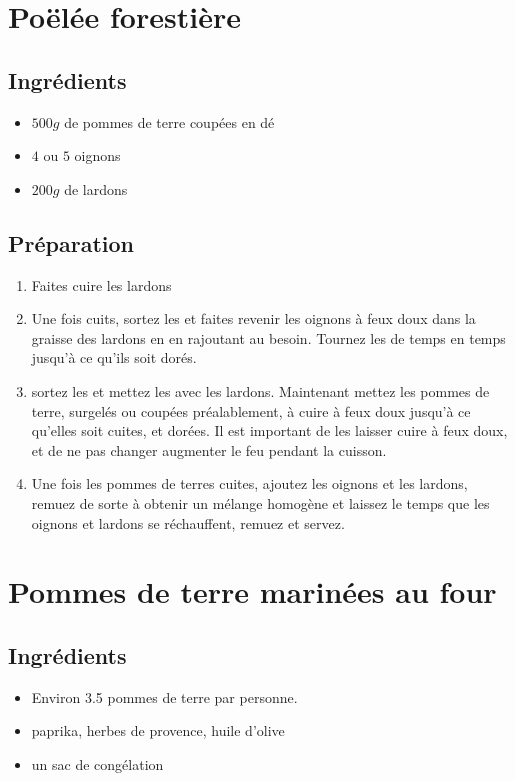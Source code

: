 \newpage
\section{Poëlée forestière}
\subsection*{Ingrédients}
\begin{itemize}
\item $500\unit{g}$ de pommes de terre coupées en dé
\item $4$ ou $5$ oignons
\item $200\unit{g}$ de lardons
\end{itemize}

\subsection*{Préparation}
\begin{enumerate}
\item Faites cuire les lardons
\item Une fois cuits, sortez les et faites revenir les oignons à feux doux dans la graisse des lardons en en rajoutant au besoin. Tournez les de temps en temps jusqu'à ce qu'ils soit dorés.
\item sortez les et mettez les avec les lardons. Maintenant mettez les pommes de terre, surgelés ou coupées préalablement, à cuire à feux doux jusqu'à ce qu'elles soit cuites, et dorées. Il est important de les laisser cuire à feux doux, et de ne pas changer augmenter le feu pendant la cuisson.
\item Une fois les pommes de terres cuites, ajoutez les oignons et les lardons, remuez de sorte à obtenir un mélange homogène et laissez le temps que les oignons et lardons se réchauffent, remuez et servez.
\end{enumerate}

\newpage
\section{Pommes de terre marinées au four}
\subsection*{Ingrédients}
\begin{itemize}
\item Environ 3.5 pommes de terre par personne.
\item paprika, herbes de provence, huile d'olive
\item un sac de congélation
\end{itemize}

